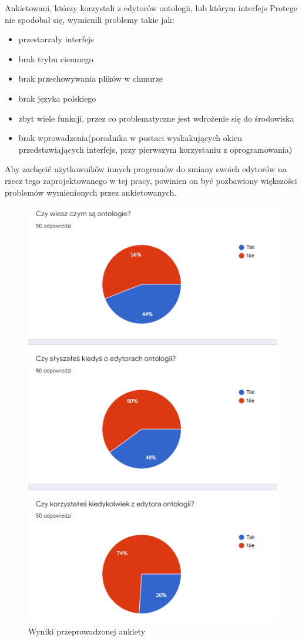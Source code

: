 \documentclass[a4paper,12pt, twoside]{book} %
\begin{document}
 Ankietowani, którzy korzystali z edytorów ontologii, lub którym interfejs Protege nie spodobał się, wymienili problemy takie jak:
\begin{itemize}
	\item przestarzały interfejs
	\item brak trybu ciemnego
	\item brak przechowywania plików w chmurze
	\item brak języka polskiego
	\item zbyt wiele funkcji, przez co problematyczne jest wdrożenie się do środowiska
	\item brak wprowadzenia(poradnika w postaci wyskakujących okien przedstawiających interfejs, przy pierwszym korzystaniu z oprogramowania)
\end{itemize}
Aby zachęcić użytkowników innych programów do zmiany swoich edytorów na rzecz tego zaprojektowanego w tej pracy, powinien on być pozbawiony większości problemów wymienionych przez ankietowanych.
\begin{figure}[h]
	\centering
	\includegraphics[scale=0.80]{wyn_ank.png}
	\caption{Wyniki przeprowadzonej ankiety}
\end{figure}
\end{document}
